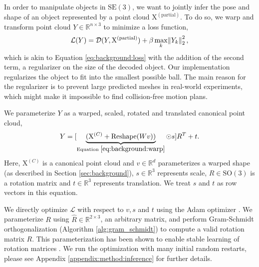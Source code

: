 \documentclass{article}
\newcommand{\pcx}[1]{\mathrm{X}^{(#1)}}
\newcommand{\pcc}{\pcx{C}}
\begin{document}
In order to manipulate objects in $\mathrm{SE}(3)$, we want to jointly infer the pose and shape of an object represented by a point cloud $\pcx{\mathrm{partial}}$.
To do so, we warp and transform point cloud $Y \in \mathbb{R}^{n \times 3}$ to minimize a loss function,
\begin{align}
    \mathcal{L}(Y) = \mathcal{D}(Y, \pcx{\mathrm{partial}}) + \beta \max_k \norm{Y_k}_2^2,
\end{align}
which is akin to Equation \ref{eq:background:loss} with the addition of the second term, a regularizer on the size of the decoded object. Our implementation regularizes the object to fit into the smallest possible ball.
The main reason for the regularizer is to prevent large predicted meshes in real-world experiments, which might make it impossible to find collision-free motion plans.

We parameterize $Y$ as a warped, scaled, rotated and translated canonical point cloud,
\begin{align}
    Y = [\underbrace{(\pcc + \mathrm{Reshape}(W v))}_{\text{Equation } \ref{eq:background:warp}} \odot s] R^T + t.
    \label{eq:method:warp}
\end{align}
Here, $\pcc$ is a canonical point cloud and $v \in \mathbb{R}^d$ parameterizes a warped shape (as described in Section \ref{sec:background}), $s \in \mathbb{R}^3$ represents scale, $R \in \mathrm{SO}(3)$ is a rotation matrix and $t \in \mathbb{R}^3$ represents translation. We treat $s$ and $t$ as row vectors in this equation.

We directly optimize $\mathcal{L}$ with respect to $v, s$ and $t$ using the Adam optimizer \cite{kingma17adam}. We parameterize $R$ using $\hat{R} \in \mathbb{R}^{2 \times 3}$, an arbitrary matrix, and perform Gram-Schmidt orthogonalization (Algorithm \ref{alg:gram_schmidt}) to compute a valid rotation matrix $R$. This parameterization has been shown to enable stable learning of rotation matrices \cite{falorsi18explorations, park22learning}. We run the optimization with many initial random restarts, please see Appendix \ref{appendix:method:inference} for further details.
\end{document}
